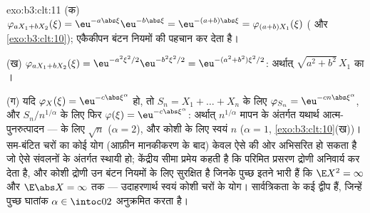 \begin{solution}{exo:b3:clt:11}
(क) $\varphi_{aX_1 + bX_2}(\xi) =
\eu^{-a\abs\xi}\eu^{-b\abs\xi} = \eu^{-(a+b)\abs\xi} =
\varphi_{(a+b)X_1}(\xi)$ ( और
\cref{exo:b3:clt:10}); एकैकीपन बंटन नियमों की पहचान कर देता
है।

(ख) $\varphi_{aX_1+bX_2}(\xi) = \eu^{-a^2\xi^2/2}
\eu^{-b^2\xi^2/2} = \eu^{-(a^2+b^2)\xi^2/2}$: अर्थात्
$\sqrt{a^2+b^2}\,X_1$ का ।

(ग) यदि $\varphi_X(\xi) = \eu^{-c\abs\xi^\alpha}$ हो, तो
$S_n = X_1 + \dots + X_n$ के लिए $\varphi_{S_n} =
\eu^{-cn\abs\xi^\alpha}$, और $S_n/n^{1/\alpha}$ के लिए फिर
$\varphi(\xi) = \eu^{-c\abs\xi^\alpha}$: अर्थात्
$n^{1/\alpha}$ मापन के अंतर्गत यथार्थ आत्म-पुनरुत्पादन ---
 के लिए $\sqrt n$ ($\alpha = 2$), और कोशी के लिए स्वयं
$n$ ($\alpha = 1$, \cref{exo:b3:clt:10}(ख))। 
सम-बंटित चरों का कोई योग (आफ़ीन मानकीकरण के बाद) केवल ऐसे
 की ओर अभिसरित हो सकता है जो ऐसे संवलनों के अंतर्गत
स्थायी हो; केंद्रीय सीमा प्रमेय कहती है कि परिमित प्रसरण
 द्रोणी अनिवार्य कर देता है, और कोशी द्रोणी उन बंटन
नियमों के लिए सुरक्षित है जिनके पुच्छ इतने भारी हैं कि $\E
X^2 = \infty$ और $\E\abs X = \infty$ तक --- उदाहरणार्थ स्वयं
कोशी चरों के योग। सार्वत्रिकता के कई द्वीप हैं, जिन्हें
पुच्छ घातांक $\alpha \in \intoc02$ अनुक्रमित करता है।
\end{solution}

